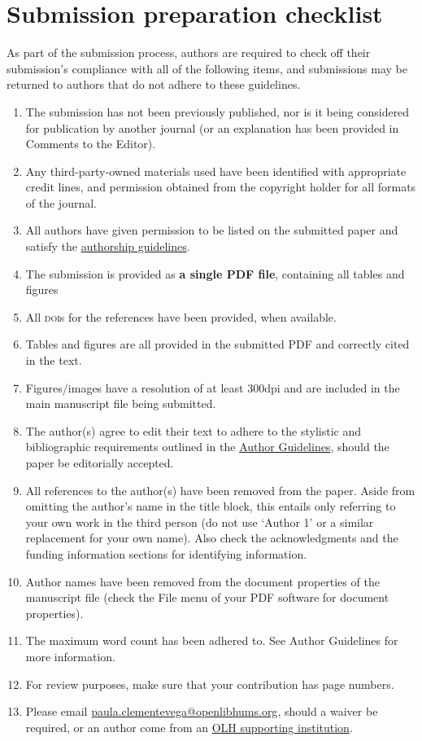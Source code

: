 \documentclass[charis,linguex]{glossa}
\begin{document}
\section{Submission preparation checklist}

As part of the submission process, authors are required to check off their submission's compliance with all of the following items, and submissions may be returned to authors that do not adhere to these guidelines.

\begin{enumerate}[label=\arabic*.]
\item The submission has not been previously published, nor is it being considered for publication by another journal (or an explanation has been provided in Comments to the Editor).
\item Any third-party-owned materials used have been identified with appropriate credit lines, and permission obtained from the copyright holder for all formats of the journal.
\item All authors have given permission to be listed on the submitted paper and satisfy the \href{https://www.glossa-journal.org/site/authorship/}{authorship guidelines}. 
\item The submission is provided as \textbf{a single PDF file}, containing all tables and figures
\item All \textsc{doi}s for the references have been provided, when available.
\item Tables and figures are all provided in the submitted PDF and correctly cited in the text.
\item Figures/images have a resolution of at least 300dpi and are included in the main manuscript file being submitted.
\item The author(s) agree to edit their text to adhere to the stylistic and bibliographic requirements outlined in the \href{https://www.glossa-journal.org/about/submissions#authorGuidelines}{Author Guidelines}, should the paper be editorially accepted.
\item All references to the author(s) have been removed from the paper. Aside from omitting the author’s name in the title block, this entails only referring to your own work in the third person (do not use ‘Author 1’ or a similar replacement for your own name). Also check the acknowledgments and the funding information sections for identifying information.
\item Author names have been removed from the document properties of the manuscript file (check the File menu of your PDF software for document properties).
\item The maximum word count has been adhered to. See Author Guidelines for more information.
\item For review purposes, make sure that your contribution has page numbers. 
\item Please email \href{paula.clementevega@openlibhums.org}{paula.clementevega@openlibhums.org}, should a waiver be required, or an author come from an \href{https://www.openlibhums.org/plugins/supporters/}{OLH supporting institution}.
\end{enumerate}
\end{document}
